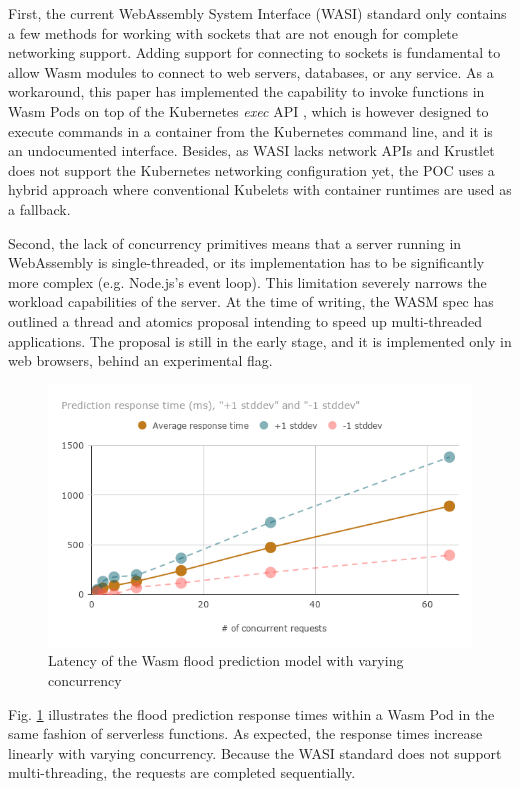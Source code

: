 First, the current WebAssembly System Interface (WASI) standard only contains a few methods for working with sockets that are not enough for complete networking support. Adding support for connecting to sockets is fundamental to allow Wasm modules to connect to web servers, databases, or any service. As a workaround, this paper has implemented the capability to invoke functions in Wasm Pods on top of the Kubernetes \emph{exec} API \cite{k8s-exec}, which is however designed to execute commands in a container from the Kubernetes command line, and it is an undocumented interface. Besides, as WASI lacks network APIs and Krustlet does not support the Kubernetes networking configuration yet, the POC uses a hybrid approach where conventional Kubelets with container runtimes are used as a fallback.

Second, the lack of concurrency primitives means that a server running in WebAssembly is single-threaded, or its implementation has to be significantly more complex (e.g. Node.js's event loop). This limitation severely narrows the workload capabilities of the server. At the time of writing, the WASM spec has outlined a thread and atomics proposal intending to speed up multi-threaded applications. The proposal is still in the early stage, and it is implemented only in web browsers, behind an experimental flag.

\begin{figure}[ht]
\centering
\includegraphics[width=\columnwidth]{figures/b-krustlet-4}
\caption{Latency of the Wasm flood prediction model with varying concurrency \label{fig:b-krustlet-4}}
\end{figure}

Fig. \ref{fig:b-krustlet-4} illustrates the flood prediction response times within a Wasm Pod in the same fashion of serverless functions. As expected, the response times increase linearly with varying concurrency. Because the WASI standard does not support multi-threading, the requests are completed sequentially.

